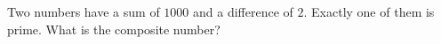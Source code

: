 Two numbers have a sum of $1000$ and a difference of $2$. Exactly one of them is prime. What is the composite number?
